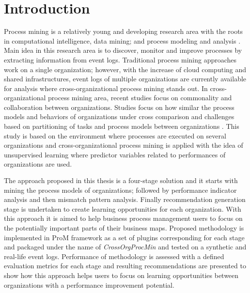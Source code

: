 \section{Introduction}
\label{sec:introduction}

Process mining is a relatively young and developing research area with the roots in computational intelligence, data mining; and process modeling and analysis \cite{van2012process}. Main idea in this research area is to discover, monitor and improve processes by extracting information from event logs. Traditional process mining approaches work on a single organization; however, with the increase of cloud computing and shared infrastructures, event logs of multiple organizations are currently available for analysis where cross-organizational process mining stands out. In cross-organizational process mining area, recent studies focus on commonality and collaboration between organizations. Studies focus on how similar the process models and behaviors of organizations under cross comparison \cite{buijs2012towards} and challenges based on partitioning of tasks and process models between organizations \cite{van2011intra}. This study is based on the environment where processes are executed on several organizations and cross-organizational process mining is applied with the idea of unsupervised learning where predictor variables related to performances of organizations are used.

The approach proposed in this thesis is a four-stage solution and it starts with mining the process models of organizations; followed by performance indicator analysis and then mismatch pattern analysis. Finally recommendation generation stage is undertaken to create learning opportunities for each organization. With this approach it is aimed to help business process management users to focus on the potentially important parts of their business maps. Proposed methodology is implemented in ProM framework \cite{verbeek2010prom} as a set of plugins corresponding for each stage and packaged under the name of \textit{CrossOrgProcMin} and tested on a synthetic and real-life event logs. Performance of methodology is assessed with a defined evaluation metrics for each stage and resulting recommendations are presented to show how this approach helps users to focus on learning opportunities between organizations with a performance improvement potential.

